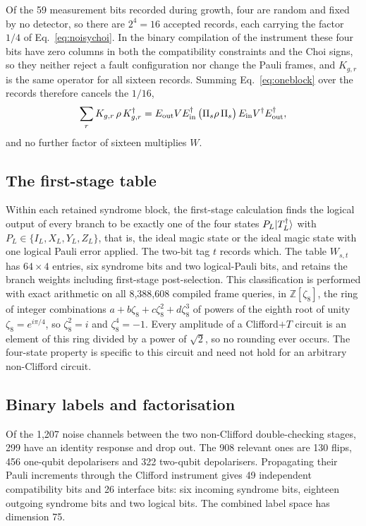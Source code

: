 Of the 59 measurement bits recorded during growth, four are random and fixed by no detector, so there are $2^4=16$ accepted records, each carrying the factor $1/4$ of Eq.~\eqref{eq:noisychoi}. In the binary compilation of the instrument these four bits have zero columns in both the compatibility constraints and the Choi signs, so they neither reject a fault configuration nor change the Pauli frames, and $K_{g,r}$ is the same operator for all sixteen records. Summing Eq.~\eqref{eq:oneblock} over the records therefore cancels the $1/16$,
\begin{equation}
 \sum_r K_{g,r}\,\rho\,K_{g,r}^\dagger=E_{\rm out}VE_{\rm in}^\dagger\,\big(\Pi_s\rho\,\Pi_s\big)\,E_{\rm in}V^\dagger E_{\rm out}^\dagger ,
\end{equation}
and no further factor of sixteen multiplies $W$.

\subsection{The first-stage table}\label{app:E-table}
Within each retained syndrome block, the first-stage calculation finds the logical output of every branch to be exactly one of the four states $P_L\lvert T_L^\dagger\rangle$ with $P_L\in\{I_L,X_L,Y_L,Z_L\}$, that is, the ideal magic state or the ideal magic state with one logical Pauli error applied. The two-bit tag $t$ records which. 
The table $W_{s,t}$ has $64\times4$ entries, six syndrome bits and two logical-Pauli bits, and retains the branch weights including first-stage post-selection. 
This classification is performed with exact arithmetic on all 8,388,608 compiled frame queries, in $\mathbb Z[\zeta_8]$, the ring of integer combinations $a+b\zeta_8+c\zeta_8^2+d\zeta_8^3$ of powers of the eighth root of unity $\zeta_8=e^{i\pi/4}$, so $\zeta_8^2=i$ and $\zeta_8^4=-1$. Every amplitude of a Clifford$+T$ circuit is an element of this ring divided by a power of $\sqrt2$, so no rounding ever occurs. The four-state property is specific to this circuit and need not hold for an arbitrary non-Clifford circuit. 
\subsection{Binary labels and factorisation}\label{app:E-labels}
Of the 1,207 noise channels between the two non-Clifford double-checking stages, 299 have an identity response and drop out. The 908 relevant ones are 130 flips, 456 one-qubit depolarisers and 322 two-qubit depolarisers. Propagating their Pauli increments through the Clifford instrument gives 49 independent compatibility bits and 26 interface bits: six incoming syndrome bits, eighteen outgoing syndrome bits and two logical bits. The combined label space has dimension 75.

